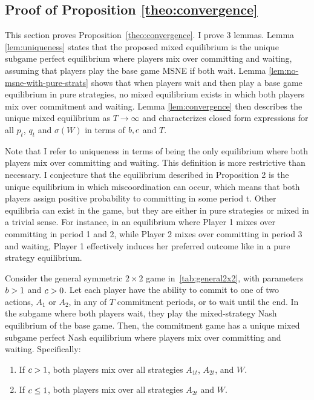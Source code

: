 \documentclass[../paper.tex]{subfiles}
\begin{document}
\subsection{Proof of Proposition \ref{theo:convergence}}\label{sec:prooftheo2}
This section proves Proposition~\ref{theo:convergence}. I prove 3 lemmas. 
Lemma \ref{lem:uniqueness} states that the proposed mixed equilibrium is the unique subgame perfect equilibrium where players mix over committing and waiting, assuming that players play the base game MSNE if both wait. 
Lemma \ref{lem:no-msne-with-pure-strats} shows that when players wait and then play a base game equilibrium in pure strategies, no mixed equilibrium exists in which both players mix over commitment and waiting. 
Lemma \ref{lem:convergence} then describes the unique mixed equilibrium as $T\to\infty$ and characterizes closed form expressions for all $p_t$, $q_t$ and $\sigma(W)$ in terms of $b,c$ and $T$.

Note that I refer to uniqueness in terms of being the only equilibrium where both players mix over committing and waiting. This definition is more restrictive than necessary. I conjecture that the equilibrium described in Proposition 2 is the unique equilibrium in which miscoordination can occur, which means that both players assign positive probability to committing in some period t. 
Other equilibria can exist in the game, but they are either in pure strategies or mixed in a trivial sense. For instance, in an equilibrium where Player 1 mixes over committing in period 1 and 2, while Player 2 mixes over committing in period 3 and waiting, Player 1 effectively induces her preferred outcome like in a pure strategy equilibrium.


\begin{lemma}\label{lem:uniqueness}
Consider the general symmetric $2\times2$ game in~\autoref{tab:general2x2}, with parameters $b > 1$ and $c > 0$. Let each player have the ability to commit to one of two actions, $A_1$ or $A_2$, in any of $T$ commitment periods, or to wait until the end. In the subgame where both players wait, they play the mixed-strategy Nash equilibrium of the base game. Then, the commitment game has a unique mixed subgame perfect Nash equilibrium where players mix over committing and waiting. Specifically:
\begin{enumerate}
    \item If $c > 1$, both players mix over all strategies $A_{1t}$, $A_{2t}$, and $W$.
    \item If $c \leq 1$, both players mix over all strategies $A_{2t}$ and $W$.
\end{enumerate}
\end{lemma}
\end{document}
